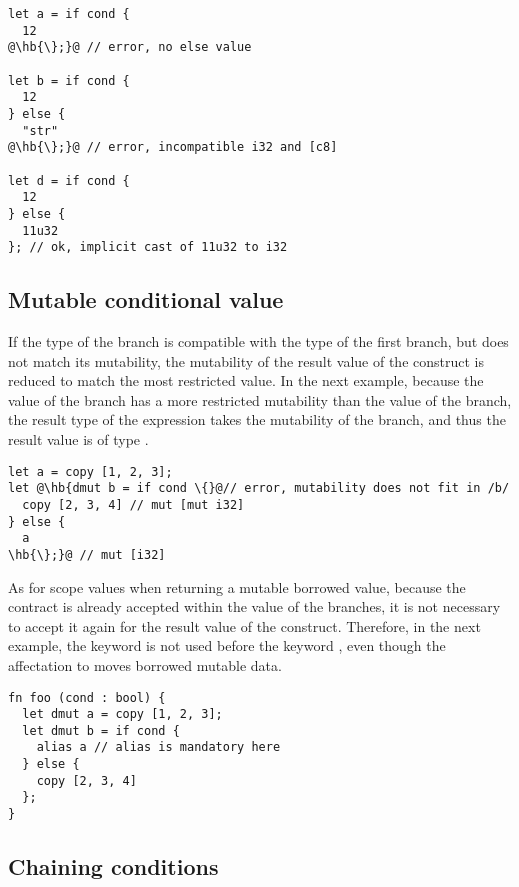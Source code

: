 \begin{lstlisting}[style=coloredverbatim, escapechar=@]
let a = if cond {
  12
@\hb{\};}@ // error, no else value

let b = if cond {
  12
} else {
  "str"
@\hb{\};}@ // error, incompatible i32 and [c8]

let d = if cond {
  12
} else {
  11u32
}; // ok, implicit cast of 11u32 to i32
\end{lstlisting}

\subsection{Mutable conditional value}

If the type of the  branch is compatible with the type of the first
branch, but does not match its mutability, the mutability of the result value of
the  construct is reduced to match the most restricted value. In the
next example, because the value of the  branch has a more
restricted mutability than the value of the  branch, the result type
of the expression takes the mutability of the  branch, and thus the
result value is of type .

\begin{lstlisting}[style=coloredverbatim, escapechar=@]
let a = copy [1, 2, 3];
let @\hb{dmut b = if cond \{}@// error, mutability does not fit in /b/
  copy [2, 3, 4] // mut [mut i32]
} else {
  a
\hb{\};}@ // mut [i32]
\end{lstlisting}

As for scope values when returning a mutable borrowed value, because
the  contract is already accepted within the value of the
branches, it is not necessary to accept it again for the result value of the
 construct. Therefore, in the next example, the keyword
 is not used before the keyword , even though the
affectation to  moves borrowed mutable data.

\begin{lstlisting}[style=coloredverbatim, escapechar=@]
fn foo (cond : bool) {
  let dmut a = copy [1, 2, 3];
  let dmut b = if cond {
    alias a // alias is mandatory here
  } else {
    copy [2, 3, 4]
  };
}
\end{lstlisting}


\subsection{Chaining conditions}


